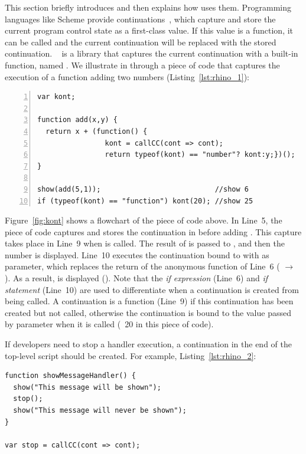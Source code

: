 \documentclass[conference]{IEEEtran}
\begin{document}
This section briefly introduces \callcc and then explains how \synccc uses
them. Programming languages like Scheme provide continuations~\cite{fw84}, which
capture and store the current program control state as a first-class value. If
this value is a function, it can be called and the current continuation will be
replaced with the stored continuation. \unwinder~\cite{unwinder:2018} is a
\javascript library that captures the current continuation with a built-in
function, named . We illustrate \callcc in \unwinder through a piece
of code that captures the execution of a function adding two numbers
(Listing~\ref{lst:rhino_1}): 


\begin{lstlisting}[linewidth=\columnwidth,numbers=left,caption=Use of continuations in the \unwinder library., label=lst:rhino_1]
var kont;

function add(x,y) {
  return x + (function() {
                kont = callCC(cont => cont);
                return typeof(kont) == "number"? kont:y;})();
}

show(add(5,1));                           //show 6
if (typeof(kont) == "function") kont(20); //show 25
\end{lstlisting}

Figure~\ref{fig:kont} shows a flowchart of the piece of code above. In Line~5,
the piece of code captures and stores the continuation in  before
adding . This capture takes place in Line~9 when  is called.  The
result of  is passed to , and then the number  is
displayed.  Line~10 executes the continuation bound to  with  as
parameter, which replaces the return of the anonymous function of Line~6 (\ie
{} $\rightarrow$ ). As a result,  is displayed
(). Note that the {\em if expression} (Line~6) and
{\em if statement} (Line~10) are used to differentiate when a continuation is
created from being called. A continuation is a function (Line~9) if this
continuation has been created but not called, otherwise the continuation is
bound to the value passed by parameter when it is called (\ie~20 in this piece
of code).

If developers need to stop a handler execution, a continuation in the end of the
top-level script should be created. For example, Listing~\ref{lst:rhino_2}:

\begin{lstlisting}[caption=Stopping a \javascript script with continuations., label=lst:rhino_2]
function showMessageHandler() {
  show("This message will be shown");
  stop();
  show("This message will never be shown");
}

var stop = callCC(cont => cont);
\end{lstlisting}
\end{document}
